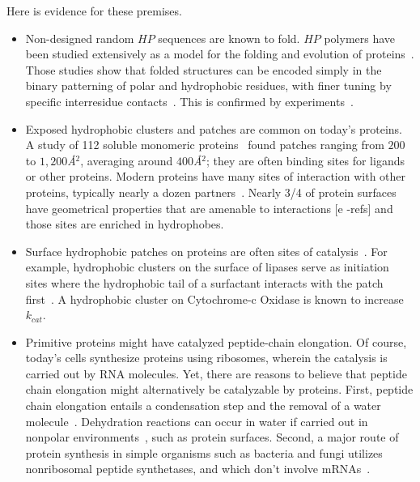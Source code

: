 \documentclass[5p,times]{elsarticle}
\begin{document}
Here is evidence for these premises.
\begin{itemize}
\item Non-designed random $HP$ sequences are known to fold.  $HP$ polymers have been studied 
extensively as a model for the folding and evolution of 
proteins~\cite{lau1989lattice,Chan1991,Miller1995,Yue1995,agarwala1997local}.  Those studies show 
that folded structures can be encoded simply in the binary patterning of polar and hydrophobic 
residues, with finer tuning by specific interresidue contacts~\cite{Yue1992,Xiong1995}.  This is 
confirmed by experiments~\cite{Lim1991,Kamtekar1993,Wei2003,Brisendine2015}. 

\item Exposed hydrophobic clusters and patches are common on today's proteins.  A study of 112 
soluble monomeric proteins~\cite{Lijnzaad1996} found patches ranging from $200$ to 
$1,200$\textit{\AA}$^2$, averaging around $400$\textit{\AA}$^2$; they are often binding sites for 
ligands or other proteins.  Modern proteins have many sites of interaction with other proteins, 
typically nearly a dozen partners~\cite{Tonddast-Navaei2015}.  Nearly 3/4 of protein surfaces have 
geometrical properties that are amenable to interactions [e -refs] and those sites are enriched in 
hydrophobes.

\item  Surface hydrophobic patches on proteins are often sites of 
catalysis~\cite{MitchellGuss1983,Lijnzaad1996,VanEe1997,Witt1998}. For example, hydrophobic 
clusters on the surface of lipases serve as initiation sites where the hydrophobic tail of a 
surfactant interacts with the patch first~\cite{VanEe1997}. A hydrophobic cluster on Cytochrome-c 
Oxidase is known to increase $k_{cat}$\cite{Witt1998}. 

\item  Primitive proteins might have catalyzed peptide-chain elongation.  Of course, today's cells 
synthesize proteins using ribosomes, wherein the catalysis is carried out by RNA molecules.  Yet, 
there are reasons to believe that peptide chain elongation might alternatively be catalyzable by 
proteins.  First, peptide chain elongation entails a condensation step and the removal of a water 
molecule~\cite[chapter 3, p.~82]{Nelson2008}.  Dehydration reactions can occur in water if carried 
out in nonpolar environments~\cite{Manabe2001,Manabe2002}, such as protein surfaces.  Second, a 
major route of protein synthesis in simple organisms such as bacteria and fungi utilizes 
nonribosomal peptide synthetases, and which don't involve 
mRNAs~\cite{Stachelhaus1998,marahiel2009working}.
\end{itemize}
\end{document}
